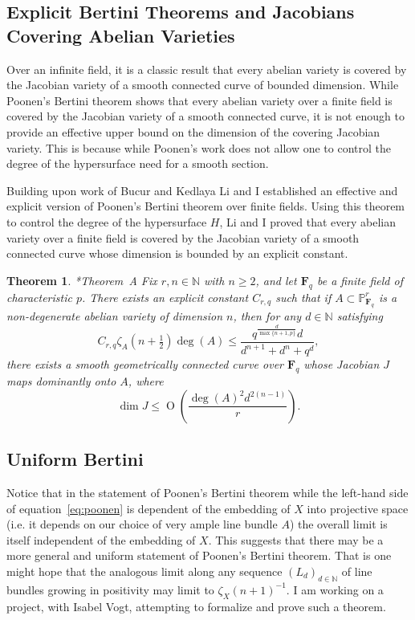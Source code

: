 \documentclass[10pt,reqno]{amsart}
\newtheorem{theorem}[lemma]{Theorem}
\theoremstyle{remark}
\newcommand{\fF}{\mathbf F}
\newcommand{\OO}{\operatorname{O}}
\newcommand{\N}{\mathbb{N}}
\renewcommand{\P}{\mathbb{P}}
\begin{document}
\subsection{Explicit Bertini Theorems and Jacobians Covering Abelian Varieties}

Over an infinite field, it is a classic result that every abelian variety is covered by the Jacobian variety of a smooth connected curve of bounded dimension. While Poonen's Bertini theorem shows that every abelian variety over a finite field is covered by the Jacobian variety of a smooth connected curve, it is not enough to provide an effective upper bound on the dimension of the covering Jacobian variety. This is because while Poonen's work does not allow one to control the degree of the hypersurface need for a smooth section. 

Building upon work of Bucur and Kedlaya \cite{bucurKedlaya12} Li and I established an effective and explicit version of Poonen's Bertini theorem over finite fields. Using this theorem to control the degree of the hypersurface $H$, Li and I proved that every abelian variety over a finite field is covered by the Jacobian variety of a smooth connected curve whose dimension is bounded by an explicit constant. 

\begin{theorem}\cite{bruceLi19}*{Theorem~A}
Fix $r,n\in \N$ with $n\geq2$, and let $\fF_{q}$ be a finite field of characteristic $p$. There exists an explicit constant $C_{r,q}$ such that if $A\subset \P^{r}_{\fF_q}$ is a non-degenerate abelian variety of dimension $n$, then for any $d\in \N$ satisfying 
\[
C_{r,q}\zeta_{A}\left(n+\tfrac{1}{2}\right) \deg(A) \leq  \frac{q^{\frac{d}{\max\{n+1,p\}}}d}{d^{n+1}+d^n+q^{d}},
\]
there exists a smooth geometrically connected curve over $\fF_{q}$ whose Jacobian $J$ maps dominantly onto $A$, where 
\[
\dim J\leq 
\OO\left(\frac{ \deg(A)^2 d^{2(n-1)}}{r}\right).
\]
\end{theorem} 

\subsection{Uniform Bertini}

Notice that in the statement of Poonen's Bertini theorem while the left-hand side of equation~\eqref{eq:poonen} is dependent of the embedding of $X$ into projective space (i.e. it depends on our choice of very ample line bundle $A$) the overall limit is itself independent of the embedding of $X$. This suggests that there may be a more general and uniform statement of Poonen's Bertini theorem. That is one might hope that the analogous limit along any sequence $(L_{d})_{d\in\N}$ of line bundles growing in positivity may limit to $\zeta_{X}(n+1)^{-1}$. I am working on a project, with Isabel Vogt, attempting to formalize and prove such a theorem.
\end{document}
